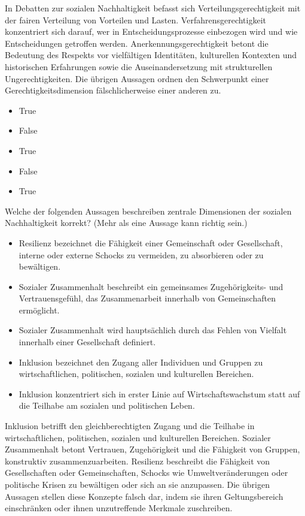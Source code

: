 \documentclass[
  nswissgerman,
  a4paper,
  openany]{book}
\providecommand{\tightlist}{%
  \setlength{\itemsep}{0pt}\setlength{\parskip}{0pt}}
\begin{document}
In Debatten zur sozialen Nachhaltigkeit befasst sich
Verteilungsgerechtigkeit mit der fairen Verteilung von Vorteilen und
Lasten. Verfahrensgerechtigkeit konzentriert sich darauf, wer in
Entscheidungsprozesse einbezogen wird und wie Entscheidungen getroffen
werden. Anerkennungsgerechtigkeit betont die Bedeutung des Respekts vor
vielfältigen Identitäten, kulturellen Kontexten und historischen
Erfahrungen sowie die Auseinandersetzung mit strukturellen
Ungerechtigkeiten. Die übrigen Aussagen ordnen den Schwerpunkt einer
Gerechtigkeitsdimension fälschlicherweise einer anderen zu.

\begin{itemize}
\tightlist
\item
  True
\item
  False
\item
  True
\item
  False
\item
  True
\end{itemize}

Welche der folgenden Aussagen beschreiben zentrale Dimensionen der
sozialen Nachhaltigkeit korrekt? (Mehr als eine Aussage kann richtig
sein.)

\begin{itemize}
\tightlist
\item[$\square$]
  Resilienz bezeichnet die Fähigkeit einer Gemeinschaft oder
  Gesellschaft, interne oder externe Schocks zu vermeiden, zu
  absorbieren oder zu bewältigen.
\item[$\square$]
  Sozialer Zusammenhalt beschreibt ein gemeinsames Zugehörigkeits- und
  Vertrauensgefühl, das Zusammenarbeit innerhalb von Gemeinschaften
  ermöglicht.
\item[$\square$]
  Sozialer Zusammenhalt wird hauptsächlich durch das Fehlen von Vielfalt
  innerhalb einer Gesellschaft definiert.
\item[$\square$]
  Inklusion bezeichnet den Zugang aller Individuen und Gruppen zu
  wirtschaftlichen, politischen, sozialen und kulturellen Bereichen.
\item[$\square$]
  Inklusion konzentriert sich in erster Linie auf Wirtschaftswachstum
  statt auf die Teilhabe am sozialen und politischen Leben.
\end{itemize}

Inklusion betrifft den gleichberechtigten Zugang und die Teilhabe in
wirtschaftlichen, politischen, sozialen und kulturellen Bereichen.
Sozialer Zusammenhalt betont Vertrauen, Zugehörigkeit und die Fähigkeit
von Gruppen, konstruktiv zusammenzuarbeiten. Resilienz beschreibt die
Fähigkeit von Gesellschaften oder Gemeinschaften, Schocks wie
Umweltveränderungen oder politische Krisen zu bewältigen oder sich an
sie anzupassen. Die übrigen Aussagen stellen diese Konzepte falsch dar,
indem sie ihren Geltungsbereich einschränken oder ihnen unzutreffende
Merkmale zuschreiben.
\end{document}
